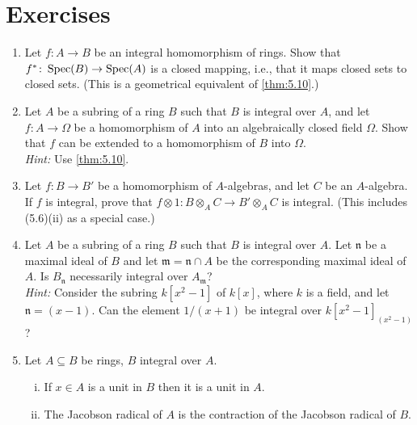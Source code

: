 \section*{Exercises}

\begin{enumerate}
    \item \label{exer1-chapter5}Let $f \colon A \to B$ be an integral homomorphism of rings. Show that $f^* \colon \operatorname{Spec}(B) \to \operatorname{Spec}(A)$ is a closed mapping, i.e., that it maps closed sets to closed sets. (This is a geometrical equivalent of \eqref{thm:5.10}.)

    \item \label{exer2-chapter5}Let $A$ be a subring of a ring $B$ such that $B$ is integral over $A$, and let $f \colon A \to \Omega$ be a homomorphism of $A$ into an algebraically closed field $\Omega$. Show that $f$ can be extended to a homomorphism of $B$ into $\Omega$.\\
    \textit{Hint:} Use \eqref{thm:5.10}.

    \item \label{exer3-chapter5}Let $f \colon B \to B'$ be a homomorphism of $A$-algebras, and let $C$ be an $A$-algebra. If $f$ is integral, prove that $f \otimes 1 \colon B \otimes_A C \to B' \otimes_A C$ is integral. (This includes (5.6)(ii) as a special case.)

    \item \label{exer4-chapter5}Let $A$ be a subring of a ring $B$ such that $B$ is integral over $A$. Let $\mathfrak{n}$ be a maximal ideal of $B$ and let $\mathfrak{m} = \mathfrak{n} \cap A$ be the corresponding maximal ideal of $A$. Is $B_{\mathfrak{n}}$ necessarily integral over $A_{\mathfrak{m}}$?\\
    \textit{Hint:} Consider the subring $k[x^2 - 1]$ of $k[x]$, where $k$ is a field, and let $\mathfrak{n} = (x - 1)$. Can the element $1/(x + 1)$ be integral over $k[x^2 - 1]_{(x^2-1)}$?

    \item \label{exer5-chapter5}Let $A \subseteq B$ be rings, $B$ integral over $A$.
    \begin{enumerate}[i)]
        \item If $x \in A$ is a unit in $B$ then it is a unit in $A$.
        \item The Jacobson radical of $A$ is the contraction of the Jacobson radical of $B$.
    \end{enumerate}


\end{enumerate}
